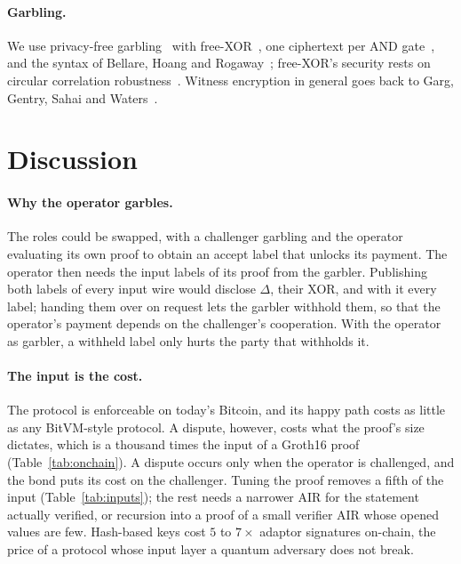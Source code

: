 \documentclass[11pt]{article}
\newcommand{\AND}{\textsf{AND}}
\begin{document}
\paragraph{Garbling.} We use privacy-free garbling~\cite{fno15privacyfree} with
free-XOR~\cite{ks08}, one ciphertext per \AND{} gate~\cite{zre15}, and the syntax
of Bellare, Hoang and Rogaway~\cite{bhr12foundations}; free-XOR's security rests on
circular correlation robustness~\cite{ckkz12freexor}. Witness encryption in general
goes back to Garg, Gentry, Sahai and Waters~\cite{ggsw13}.

\section{Discussion}\label{sec:discussion}

\paragraph{Why the operator garbles.} The roles could be swapped, with a
challenger garbling and the operator evaluating its own proof to obtain an accept
label that unlocks its payment. The operator then needs the input labels of its
proof from the garbler. Publishing both labels of every input wire would disclose
$\Delta$, their XOR, and with it every label; handing them over on request lets
the garbler withhold them, so that the operator's payment depends on the
challenger's cooperation. With the operator as garbler, a withheld label only
hurts the party that withholds it.

\paragraph{The input is the cost.} The protocol is enforceable on today's
Bitcoin, and its happy path costs as little as any BitVM-style protocol. A
dispute, however, costs what the proof's size dictates, which is a thousand times
the input of a Groth16 proof (Table~\ref{tab:onchain}). A dispute occurs only when the operator is
challenged, and the bond puts its cost on the challenger. Tuning the proof
removes a fifth of the input (Table~\ref{tab:inputs}); the rest needs a narrower
AIR for the statement actually verified, or recursion into a proof of a small
verifier AIR whose opened values are few. Hash-based keys cost $5$ to $7\times$
adaptor signatures on-chain, the price of a protocol whose input layer a quantum
adversary does not break.
\end{document}
